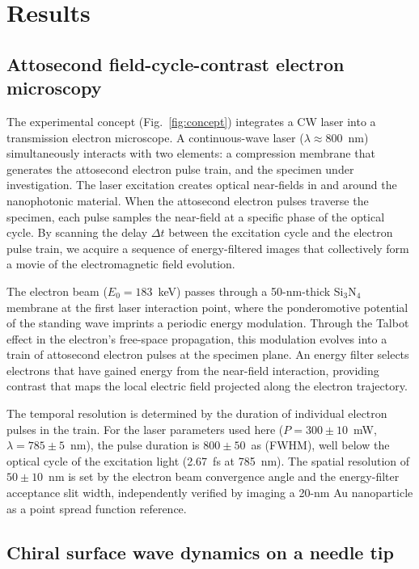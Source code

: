 \documentclass[12pt]{article}
\begin{document}
\section{Results}
\label{sec:results}

\subsection{Attosecond field-cycle-contrast electron microscopy}

The experimental concept (Fig.~\ref{fig:concept}) integrates a CW laser into a transmission electron microscope. A continuous-wave laser ($\lambda \approx 800$~nm) simultaneously interacts with two elements: a compression membrane that generates the attosecond electron pulse train, and the specimen under investigation. The laser excitation creates optical near-fields in and around the nanophotonic material. When the attosecond electron pulses traverse the specimen, each pulse samples the near-field at a specific phase of the optical cycle. By scanning the delay $\Delta t$ between the excitation cycle and the electron pulse train, we acquire a sequence of energy-filtered images that collectively form a movie of the electromagnetic field evolution.

The electron beam ($E_0 = 183$~keV) passes through a 50-nm-thick Si$_3$N$_4$ membrane at the first laser interaction point, where the ponderomotive potential of the standing wave imprints a periodic energy modulation. Through the Talbot effect in the electron's free-space propagation, this modulation evolves into a train of attosecond electron pulses at the specimen plane. An energy filter selects electrons that have gained energy from the near-field interaction, providing contrast that maps the local electric field projected along the electron trajectory.

The temporal resolution is determined by the duration of individual electron pulses in the train. For the laser parameters used here ($P = 300 \pm 10$~mW, $\lambda = 785 \pm 5$~nm), the pulse duration is $800 \pm 50$~as (FWHM), well below the optical cycle of the excitation light (2.67~fs at 785~nm). The spatial resolution of $50 \pm 10$~nm is set by the electron beam convergence angle and the energy-filter acceptance slit width, independently verified by imaging a 20-nm Au nanoparticle as a point spread function reference.

\subsection{Chiral surface wave dynamics on a needle tip}
\end{document}
